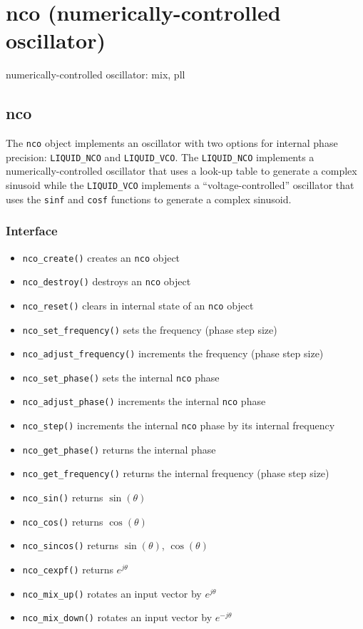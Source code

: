 % 
%

\section{nco (numerically-controlled oscillator)}
\label{module:nco}
numerically-controlled oscillator: mix, pll

\subsection{{nco}}
\label{module:nco:nco}
The {\tt nco} object implements an oscillator with two options for internal
phase precision: {\tt LIQUID\_NCO} and {\tt LIQUID\_VCO}.
The {\tt LIQUID\_NCO} implements a numerically-controlled oscillator that uses
a look-up table to generate a complex sinusoid while
the {\tt LIQUID\_VCO} implements a ``voltage-controlled'' oscillator that uses
the {\tt sinf} and {\tt cosf} functions to generate a complex sinusoid.

\subsubsection{Interface}
\begin{itemize}
\item {\tt nco\_create()} creates an {\tt nco} object
\item {\tt nco\_destroy()} destroys an {\tt nco} object
\item {\tt nco\_reset()} clears in internal state of an {\tt nco} object
\item {\tt nco\_set\_frequency()} sets the frequency (phase step size)
\item {\tt nco\_adjust\_frequency()} increments the frequency (phase step size)
\item {\tt nco\_set\_phase()} sets the internal {\tt nco} phase
\item {\tt nco\_adjust\_phase()} increments the internal {\tt nco} phase
\item {\tt nco\_step()} increments the internal {\tt nco} phase by its
    internal frequency
\item {\tt nco\_get\_phase()} returns the internal phase
\item {\tt nco\_get\_frequency()} returns the internal frequency (phase step
    size)
\item {\tt nco\_sin()} returns $\sin(\theta)$
\item {\tt nco\_cos()} returns $\cos(\theta)$
\item {\tt nco\_sincos()} returns $\sin(\theta)$, $\cos(\theta)$
\item {\tt nco\_cexpf()} returns $e^{j\theta}$
\item {\tt nco\_mix\_up()} rotates an input vector by $e^{j\theta}$
\item {\tt nco\_mix\_down()} rotates an input vector by $e^{-j\theta}$
\end{itemize}


